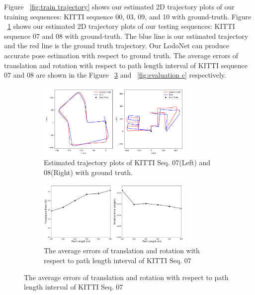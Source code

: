 \documentclass[sigconf]{acmart}
\def\lodo{LodoNet}
\begin{document}
 Figure ~\ref{fig:train trajectory} shows our estimated 2D trajectory plots of our training sequences: KITTI sequence 00, 03, 09, and 10 with ground-truth. Figure ~\ref{fig:evaluation a} shows our estimated 2D trajectory plots of our testing sequences: KITTI sequence 07 and 08 with ground-truth. The blue line is our estimated trajectory and the red line is the ground truth trajectory.  Our \lodo{} can produce accurate pose estimation with respect to ground truth. The average errors of translation and rotation with respect to path length interval of KITTI sequence 07 and 08 are shown in the Figure ~\ref{fig:evaluation b} and  ~\ref{fig:evaluation c} respectively. 



\begin{figure}[h]
\setlength{\belowcaptionskip}{-0.1cm} 
     \centering
     \begin{subfigure}[b]{\columnwidth}
         \centering
         \includegraphics[width=0.82\textwidth]{Figures/trajectory.png}
         \caption{Estimated trajectory plots of KITTI Seq. 07(Left) and 08(Right) with ground truth.}
         \label{fig:evaluation a}
     \end{subfigure}

     \begin{subfigure}[b]{\columnwidth}
         \centering
         \includegraphics[width=0.82\textwidth]{Figures/error7.png}
         \caption{The average errors of translation and rotation with respect to path length interval of KITTI Seq. 07}
         \label{fig:evaluation b}
     \end{subfigure}
     

\end{figure}
\end{document}

